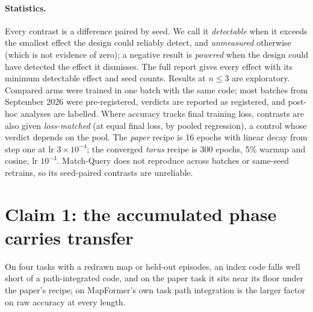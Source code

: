 \documentclass[10pt]{article}
\begin{document}
\paragraph{Statistics.} Every contrast is a difference paired by seed. We call it \emph{detectable} when it
exceeds the smallest effect the design could reliably detect, and \emph{unmeasured} otherwise (which is not
evidence of zero); a negative result is \emph{powered} when the design could have detected the effect it dismisses.
The full report gives every effect with its minimum detectable effect and seed counts. Results at $n\le3$ are
exploratory. Compared arms were trained in one batch with the same code; most batches from September 2026 were
pre-registered, verdicts are reported as registered, and post-hoc analyses are labelled. Where accuracy tracks final
training loss, contrasts are also given \emph{loss-matched} (at equal final loss, by pooled regression), a control
whose verdict depends on the pool. The \emph{paper} recipe is 16 epochs with linear decay from step
one at lr $3\times10^{-4}$; the converged \emph{torus} recipe is 300 epochs, 5\% warmup and cosine, lr $10^{-3}$.
Match-Query does not reproduce across batches or same-seed retrains, so its seed-paired contrasts are unreliable.

\section{Claim 1: the accumulated phase carries transfer}
\label{sec:claim1}

On four tasks with a redrawn map or held-out episodes, an index code falls well short of a path-integrated code,
and on the paper task it sits near its floor under the paper's recipe; on MapFormer's own task path integration
is the larger factor on raw accuracy at every length.
\end{document}
